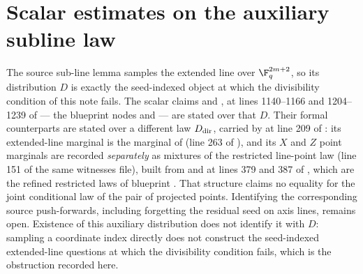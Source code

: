 \documentclass[11pt]{article}
\begin{document}
\section{Scalar estimates on the auxiliary subline law}
\label{sec:auxiliary-subline-scalars}

The source sub-line lemma  samples the extended line
over $\F_q^{2m+2}$, so its distribution $D$ is exactly the seed-indexed
object at which the divisibility condition of this note fails.  The scalar
claims  and , at lines 1140--1166 and
1204--1239 of
 --- the
blueprint nodes  and  --- are
stated over that $D$.  Their formal counterparts are stated over a different
law $D_{\rm dir}$, carried by  at line 209 of
: its extended-line
marginal is the marginal of  (line 263 of
), and its
$X$ and $Z$ point marginals are recorded \emph{separately} as mixtures of
the restricted line-point law  (line 151 of
the same witnesses file), built from  and
 at lines 379 and 387 of
, which are the refined
restricted laws of blueprint .  That structure
claims no equality for the joint conditional law of the pair of projected
points.  Identifying the corresponding source push-forwards, including
forgetting the residual seed on axis lines, remains open.  Existence of this
auxiliary distribution does not identify it with $D$: sampling a coordinate
index directly does not construct the seed-indexed extended-line questions
at which the divisibility condition fails, which is the obstruction recorded
here.
\end{document}
